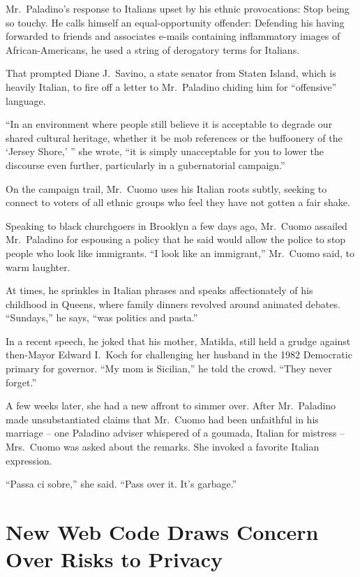﻿\documentclass[12pt]{article}
\begin{document}
Mr.~Paladino's response to Italians upset by his ethnic provocations: Stop being so touchy. He calls
himself an equal-opportunity offender: Defending his having forwarded to friends and associates
e-mails containing inflammatory images of African-Americans, he used a string of derogatory terms
for Italians.

That prompted Diane J.~Savino, a state senator from Staten Island, which is heavily Italian, to fire
off a letter to Mr.~Paladino chiding him for ``offensive'' language.

``In an environment where people still believe it is acceptable to degrade our shared cultural
heritage, whether it be mob references or the buffoonery of the `Jersey Shore,' '' she wrote, ``it
is simply unacceptable for you to lower the discourse even further, particularly in a gubernatorial
campaign.''

On the campaign trail, Mr.~Cuomo uses his Italian roots subtly, seeking to connect to voters of all
ethnic groups who feel they have not gotten a fair shake.

Speaking to black churchgoers in Brooklyn a few days ago, Mr.~Cuomo assailed Mr.~Paladino for
espousing a policy that he said would allow the police to stop people who look like immigrants. ``I
look like an immigrant,'' Mr.~Cuomo said, to warm laughter.

At times, he sprinkles in Italian phrases and speaks affectionately of his childhood in Queens,
where family dinners revolved around animated debates. ``Sundays,'' he says, ``was politics and
pasta.''

In a recent speech, he joked that his mother, Matilda, still held a grudge against then-Mayor Edward
I.~Koch for challenging her husband in the 1982 Democratic primary for governor. ``My mom is
Sicilian,'' he told the crowd. ``They never forget.''

A few weeks later, she had a new affront to simmer over. After Mr.~Paladino made unsubstantiated
claims that Mr.~Cuomo had been unfaithful in his marriage -- one Paladino adviser whispered of a
goumada, Italian for mistress -- Mrs.~Cuomo was asked about the remarks. She invoked a favorite
Italian expression.

``Passa ci sobre,'' she said. ``Pass over it. It's garbage.''


\section{New Web Code Draws Concern Over Risks to Privacy}
\end{document}
